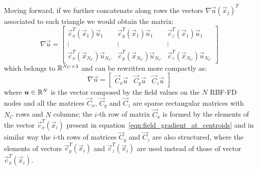 Moving forward, if we further concatenate along rows the vectors $\nabla \vec{u}(\vec{x}_j)^T$ associated to each triangle we would obtain the matrix:
\begin{equation}
	\label{eqn:field_gradient_at_centroids}
		\nabla \vec{u} =
			\begin{bmatrix}
				\vec{c}_x^T(\vec{x}_1) \vec{u}_1  			  &  \vec{c}_y^T(\vec{x}_1) \vec{u}_1  		   &  \vec{c}_z^T(\vec{x}_1) \vec{u}_1  							\\
				\vdots									  & \vdots					   		 		   & \vdots															\\
				\vec{c}_x^T(\vec{x}_{N_C}) \vec{u}_{N_C}  &  \vec{c}_y^T(\vec{x}_{N_C}) \vec{u}_{N_C}  &  \vec{c}_z^T(\vec{x}_{N_C}) \vec{u}_{N_C}
			\end{bmatrix}
\end{equation}
which belongs to $\mathbb{R}^{N_C \times 3}$ and can be rewritten more compactly as:
\begin{equation}
	\nabla \vec{u} =
	\begin{bmatrix}
		\vec{C}_x \vec{u}  &  \vec{C}_y \vec{u}  &  \vec{C}_z \vec{u}
	\end{bmatrix}
\end{equation}
where $\boldsymbol{u} \in \mathbb{R}^{N}$ is the vector composed by the field values on the $N$ RBF-FD nodes and all the matrices $\vec{C}_x$, $\vec{C}_y$ and $\vec{C}_z$ are sparse rectangular matrices with $N_C$ rows and $N$ columns; the $i$-th row of matrix $\vec{C}_x$ is formed by the elements of the vector $\vec{c}_x^T(\vec{x}_i)$ present in equation~\eqref{eqn:field_gradient_at_centroids} and in similar way the $i$-th rows of matrices $\vec{C}_y$ and $\vec{C}_z$ are also structured, where the elements of vectors $\vec{c}_y^T(\vec{x}_i)$ and $\vec{c}_z^T(\vec{x}_i)$ are used instead of those of vector $\vec{c}_x^T(\vec{x}_i)$.

